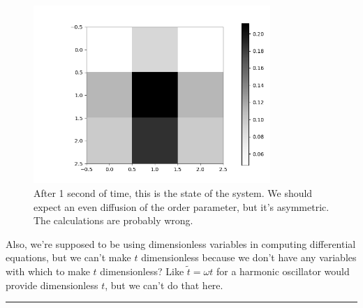 \documentclass{article}
\begin{document}
\begin{figure}[h!]
	\centering
	\includegraphics[width=0.8\textwidth]{rudimentary_animation_frame.png}
	\caption{\label{phi after 1 second}After 1 second of time, this is the state of the system. We should expect an even diffusion of the order parameter, but it's asymmetric. The calculations are probably wrong.}
\end{figure}

Also, we're supposed to be using dimensionless variables in computing differential equations, but we can't make $t$ dimensionless because we don't have any variables with which to make $t$ dimensionless? Like $\tilde{t}=\omega t$ for a harmonic oscillator would provide dimensionless $t$, but we can't do that here.

\rule{\textwidth}{0.4pt}
\end{document}
